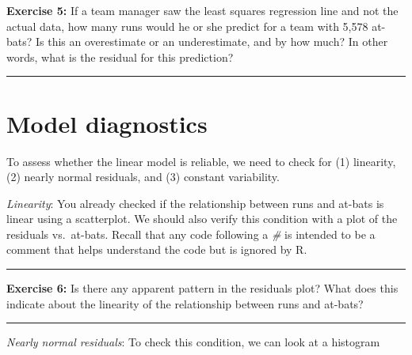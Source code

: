 \documentclass[]{book}
\newenvironment{Shaded}{\begin{snugshade}}{\end{snugshade}}
\newcommand{\KeywordTok}[1]{\textcolor[rgb]{0.13,0.29,0.53}{\textbf{#1}}}
\newcommand{\DataTypeTok}[1]{\textcolor[rgb]{0.13,0.29,0.53}{#1}}
\newcommand{\DecValTok}[1]{\textcolor[rgb]{0.00,0.00,0.81}{#1}}
\newcommand{\StringTok}[1]{\textcolor[rgb]{0.31,0.60,0.02}{#1}}
\newcommand{\CommentTok}[1]{\textcolor[rgb]{0.56,0.35,0.01}{\textit{#1}}}
\newcommand{\OperatorTok}[1]{\textcolor[rgb]{0.81,0.36,0.00}{\textbf{#1}}}
\newcommand{\NormalTok}[1]{#1}
\theoremstyle{definition}
\theoremstyle{definition}
\theoremstyle{definition}
\theoremstyle{remark}
\begin{document}
\textbf{Exercise 5:} If a team manager saw the least squares regression
line and not the actual data, how many runs would he or she predict for
a team with 5,578 at-bats? Is this an overestimate or an underestimate,
and by how much? In other words, what is the residual for this
prediction?

\begin{center}\rule{0.5\linewidth}{\linethickness}\end{center}

\section{Model diagnostics}\label{model-diagnostics}

To assess whether the linear model is reliable, we need to check for (1)
linearity, (2) nearly normal residuals, and (3) constant variability.

\emph{Linearity}: You already checked if the relationship between runs
and at-bats is linear using a scatterplot. We should also verify this
condition with a plot of the residuals vs.~at-bats. Recall that any code
following a \emph{\#} is intended to be a comment that helps understand
the code but is ignored by R.

\begin{Shaded}
\end{Shaded}

\begin{center}\rule{0.5\linewidth}{\linethickness}\end{center}

\textbf{Exercise 6:} Is there any apparent pattern in the residuals
plot? What does this indicate about the linearity of the relationship
between runs and at-bats?

\begin{center}\rule{0.5\linewidth}{\linethickness}\end{center}

\emph{Nearly normal residuals}: To check this condition, we can look at
a histogram
\end{document}
